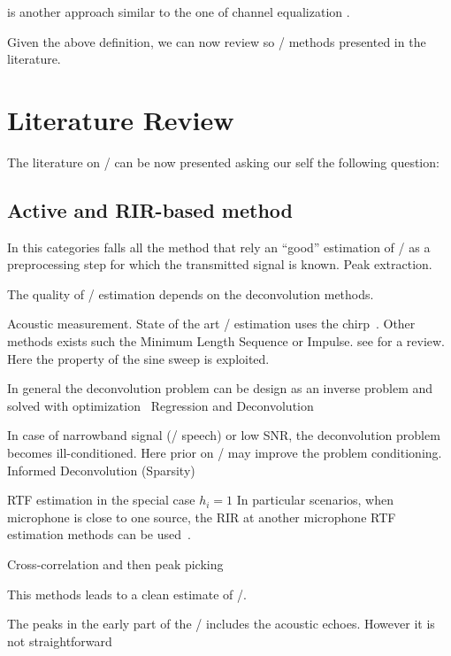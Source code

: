  is another approach similar to the one of channel equalization .

Given the above definition, we can now review so \AER/ methods presented in the literature.

\section{Literature Review}

The literature on \AER/ can be now presented asking our self the following question:


\subsection{Active and RIR-based method}
In this categories falls all the method that rely an ``good'' estimation of \RIRs/ as a preprocessing step for which the transmitted signal is known.
Peak extraction.

The quality of \RIR/ estimation depends on the deconvolution methods.

Acoustic measurement.
State of the art \RIR/ estimation uses the chirp~.
Other methods exists such the Minimum Length Sequence or Impulse.
see  for a review.
Here the property of the sine sweep is exploited.

In general the deconvolution problem can be design as an inverse problem and solved with optimization~
Regression and Deconvolution

In case of narrowband signal (\eg/ speech) or low SNR, the deconvolution problem becomes ill-conditioned.
Here prior on \RIR/ may improve the problem conditioning.
Informed Deconvolution (Sparsity)

RTF estimation in the special case $h_i = 1$
In particular scenarios, when microphone is close to one source, the RIR at another microphone RTF estimation methods can be used~.

Cross-correlation and then peak picking

This methods leads to a clean estimate of \RIR/.

The peaks in the early part of the \RIR/ includes the acoustic echoes.
However it is not straightforward~


